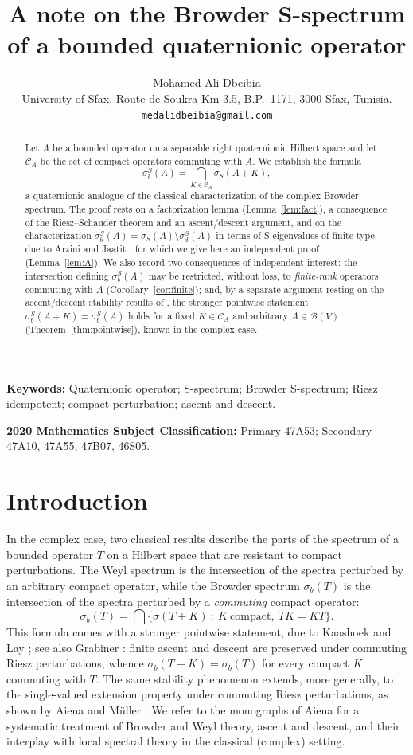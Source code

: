 \documentclass[11pt,a4paper]{article}
\title{A note on the Browder S-spectrum\\
of a bounded quaternionic operator}
\author{
   Mohamed Ali Dbeibia\\[0.5em]
  \small University of Sfax, Route de Soukra Km 3.5, B.P.\ 1171, 3000 Sfax, Tunisia.\\
  \small \texttt{medalidbeibia@gmail.com}
}
\date{}
\theoremstyle{plain}
\theoremstyle{remark}
\newcommand{\V}{V}
\newcommand{\B}{\mathcal B}
\newcommand{\CA}{\mathcal C_A}
\newcommand{\sS}{\sigma_S}
\newcommand{\sigb}{\sigma_b^S}
\newcommand{\sd}{\sigma_d^S}
\begin{document}
\maketitle

\begin{abstract}
Let $A$ be a bounded operator on a separable right quaternionic Hilbert space and let $\CA$ be the set of compact operators commuting with $A$. We establish the formula
\[
\sigb(A)=\bigcap_{K\in\CA} \sS(A+K),
\]
a quaternionic analogue of the classical characterization of the complex Browder spectrum. The proof rests on a factorization lemma (Lemma~\ref{lem:fact}), a consequence of the Riesz--Schauder theorem and an ascent/descent argument, and on the characterization $\sigb(A)=\sS(A)\setminus\sd(A)$ in terms of S-eigenvalues of finite type, due to Arzini and Jaatit \cite{AJ26}, for which we give here an independent proof (Lemma~\ref{lem:A}). We also record two consequences of independent interest: the intersection defining $\sigb(A)$ may be restricted, without loss, to \emph{finite-rank} operators commuting with $A$ (Corollary~\ref{cor:finite}); and, by a separate argument resting on the ascent/descent stability results of \cite{KD24}, the stronger pointwise statement $\sigb(A+K)=\sigb(A)$ holds for a fixed $K\in\CA$ and arbitrary $A\in\B(\V)$ (Theorem~\ref{thm:pointwise}), known in the complex case.
\end{abstract}

\medskip
\noindent\textbf{Keywords:} Quaternionic operator; S-spectrum; Browder S-spectrum; Riesz idempotent; compact perturbation; ascent and descent.

\noindent\textbf{2020 Mathematics Subject Classification:} Primary 47A53; Secondary 47A10, 47A55, 47B07, 46S05.

\section{Introduction}

In the complex case, two classical results describe the parts of the spectrum of a bounded operator $T$ on a Hilbert space that are resistant to compact perturbations. The Weyl spectrum is the intersection of the spectra perturbed by an arbitrary compact operator, while the Browder spectrum $\sigma_b(T)$ is the intersection of the spectra perturbed by a \emph{commuting} compact operator:
\[
\sigma_b(T)=\bigcap\big\{\sigma(T+K)\ :\ K\ \text{compact},\ TK=KT\big\}.
\]
This formula comes with a stronger pointwise statement, due to Kaashoek and Lay \cite{KL72}; see also Grabiner \cite{Gra78}: finite ascent and descent are preserved under commuting Riesz perturbations, whence $\sigma_b(T+K)=\sigma_b(T)$ for every compact $K$ commuting with $T$. The same stability phenomenon extends, more generally, to the single-valued extension property under commuting Riesz perturbations, as shown by Aiena and M\"uller \cite{AM15}. We refer to the monographs of Aiena \cite{Ai04,Ai18} for a systematic treatment of Browder and Weyl theory, ascent and descent, and their interplay with local spectral theory in the classical (complex) setting.
\end{document}
